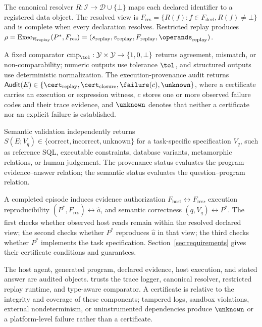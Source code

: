 The canonical resolver $R:\mathcal I\rightarrow\mathcal D\cup\{\bot\}$
maps each declared identifier to a registered data object. The resolved view
is $F_{\mathrm{res}}=\{R(f):f\in F_{\mathrm{decl}},R(f)\neq\bot\}$ and is
complete when every declaration resolves. Restricted replay produces
$\rho=\operatorname{Exec}_{\mathcal R_{\mathrm{replay}}}
(P^*,F_{\mathrm{res}})
=(s_{\mathrm{replay}},v_{\mathrm{replay}},F_{\mathrm{replay}},
\operands_{\mathrm{replay}})$.

A fixed comparator
$\operatorname{cmp}_{\tol}:\mathcal Y\times\mathcal Y
\rightarrow\{1,0,\bot\}$ returns agreement, mismatch, or non-comparability;
numeric outputs use tolerance $\tol$, and structured outputs use
deterministic normalization. The execution-provenance audit returns
$\mathsf{Audit}(E)\in
\{\cert_{\mathrm{replay}},\cert_{\mathrm{closure}},
\failure(c),\unknown\}$, where a certificate carries an execution or
expression witness, $c$ stores one or more observed failure codes and their
trace evidence, and $\unknown$ denotes that neither a certificate nor an
explicit failure is established.

Semantic validation independently returns
$S(E;V_q)\in\{\mathrm{correct},\mathrm{incorrect},\mathrm{unknown}\}$ for a
task-specific specification $V_q$, such as reference SQL, executable
constraints, database variants, metamorphic relations, or human judgement.
The provenance status evaluates the program--evidence--answer relation; the
semantic status evaluates the question--program relation.

A completed episode induces evidence authorization
$F_{\mathrm{host}}\leftrightarrow F_{\mathrm{res}}$, execution
reproducibility $(P^*,F_{\mathrm{res}})\leftrightarrow\hat a$, and semantic
correctness $(q,V_q)\leftrightarrow P^*$. The first checks whether observed
host reads remain within the resolved declared view; the second checks whether
$P^*$ reproduces $\hat a$ in that view; the third checks whether $P^*$
implements the task specification. Section~\ref{sec:requirements} gives their
certificate conditions and guarantees.

The host agent, generated program, declared evidence, host execution, and
stated answer are audited objects. \ledger trusts the trace logger, canonical
resolver, restricted replay runtime, and type-aware comparator. A certificate
is relative to the integrity and coverage of these components; tampered logs,
sandbox violations, external nondeterminism, or uninstrumented dependencies
produce $\unknown$ or a platform-level failure rather than a certificate.

